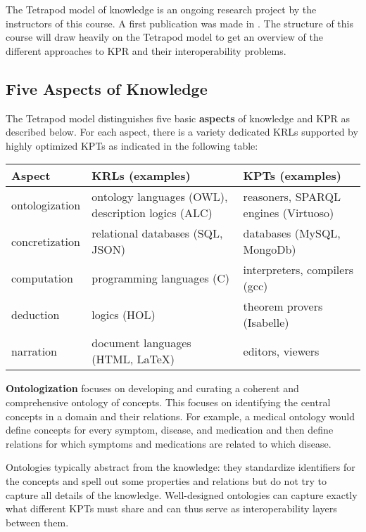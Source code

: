 The Tetrapod model of knowledge is an ongoing research project by the instructors of this course.
A first publication was made in \cite{CFKR:tetrapod:19}.
The structure of this course will draw heavily on the Tetrapod model to get an overview of the different approaches to KPR and their interoperability problems.

\subsection{Five Aspects of Knowledge}

The Tetrapod model distinguishes five basic \textbf{aspects} of knowledge and KPR as described below.
For each aspect, there is a variety dedicated KRLs supported by highly optimized KPTs as indicated in the following table:

\begin{center}
\begin{tabular}{lll}
\toprule
Aspect & KRLs (examples) & KPTs (examples) \\
\midrule
ontologization & ontology languages (OWL), description logics (ALC) & reasoners, SPARQL engines (Virtuoso) \\
concretization & relational databases (SQL, JSON) & databases (MySQL, MongoDb) \\
computation & programming languages (C) & interpreters, compilers (gcc) \\
deduction & logics (HOL) & theorem provers (Isabelle) \\
narration & document languages (HTML, LaTeX) & editors, viewers \\
\bottomrule
\end{tabular}
\end{center}

\textbf{Ontologization} focuses on developing and curating a coherent and comprehensive ontology of concepts.
This focuses on identifying the central concepts in a domain and their relations.
For example, a medical ontology would define concepts for every symptom, disease, and medication and then define relations for which symptoms and medications are related to which disease.

Ontologies typically abstract from the knowledge: they standardize identifiers for the concepts and spell out some properties and relations but do not try to capture all details of the knowledge.
Well-designed ontologies can capture exactly what different KPTs must share and can thus serve as interoperability layers between them.

